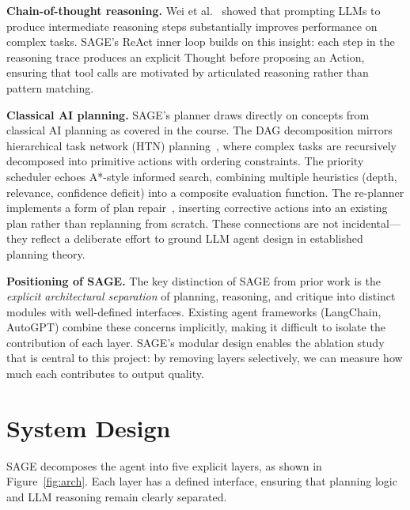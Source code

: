 \documentclass[11pt]{article}
\begin{document}
\textbf{Chain-of-thought reasoning.}
Wei et al.~\cite{wei2022chain} showed that prompting LLMs to produce intermediate reasoning steps substantially improves performance on complex tasks. SAGE's ReAct inner loop builds on this insight: each step in the reasoning trace produces an explicit Thought before proposing an Action, ensuring that tool calls are motivated by articulated reasoning rather than pattern matching.

\textbf{Classical AI planning.}
SAGE's planner draws directly on concepts from classical AI planning as covered in the course. The DAG decomposition mirrors hierarchical task network (HTN) planning~\cite{erol1994htn}, where complex tasks are recursively decomposed into primitive actions with ordering constraints. The priority scheduler echoes A*-style informed search, combining multiple heuristics (depth, relevance, confidence deficit) into a composite evaluation function. The re-planner implements a form of plan repair~\cite{fox2006plan}, inserting corrective actions into an existing plan rather than replanning from scratch. These connections are not incidental---they reflect a deliberate effort to ground LLM agent design in established planning theory.

\textbf{Positioning of SAGE.}
The key distinction of SAGE from prior work is the \emph{explicit architectural separation} of planning, reasoning, and critique into distinct modules with well-defined interfaces. Existing agent frameworks (LangChain, AutoGPT) combine these concerns implicitly, making it difficult to isolate the contribution of each layer. SAGE's modular design enables the ablation study that is central to this project: by removing layers selectively, we can measure how much each contributes to output quality.

\section{System Design}

SAGE decomposes the agent into five explicit layers, as shown in Figure~\ref{fig:arch}. Each layer has a defined interface, ensuring that planning logic and LLM reasoning remain clearly separated.
\end{document}
